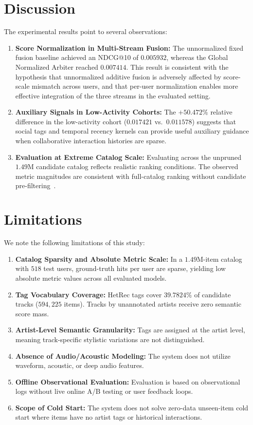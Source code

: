 \documentclass[conference]{IEEEtran}
\begin{document}
\section{Discussion}
The experimental results point to several observations:
\begin{enumerate}
    \item \textbf{Score Normalization in Multi-Stream Fusion:} The unnormalized fixed fusion baseline achieved an NDCG@10 of $0.005932$, whereas the Global Normalized Arbiter reached $0.007414$. This result is consistent with the hypothesis that unnormalized additive fusion is adversely affected by score-scale mismatch across users, and that per-user normalization enables more effective integration of the three streams in the evaluated setting.
    \item \textbf{Auxiliary Signals in Low-Activity Cohorts:} The $+50.472\%$ relative difference in the low-activity cohort ($0.017421$ vs.\ $0.011578$) suggests that social tags and temporal recency kernels can provide useful auxiliary guidance when collaborative interaction histories are sparse.
    \item \textbf{Evaluation at Extreme Catalog Scale:} Evaluating across the unpruned $1.49\text{M}$ candidate catalog reflects realistic ranking conditions. The observed metric magnitudes are consistent with full-catalog ranking without candidate pre-filtering~\cite{cremonesi2010performance}.
\end{enumerate}

\section{Limitations}
We note the following limitations of this study:
\begin{enumerate}
    \item \textbf{Catalog Sparsity and Absolute Metric Scale:} In a $1.49\text{M}$-item catalog with $518$ test users, ground-truth hits per user are sparse, yielding low absolute metric values across all evaluated models.
    \item \textbf{Tag Vocabulary Coverage:} HetRec tags cover $39.7824\%$ of candidate tracks ($594,225$ items). Tracks by unannotated artists receive zero semantic score mass.
    \item \textbf{Artist-Level Semantic Granularity:} Tags are assigned at the artist level, meaning track-specific stylistic variations are not distinguished.
    \item \textbf{Absence of Audio/Acoustic Modeling:} The system does not utilize waveform, acoustic, or deep audio features.
    \item \textbf{Offline Observational Evaluation:} Evaluation is based on observational logs without live online A/B testing or user feedback loops.
    \item \textbf{Scope of Cold Start:} The system does not solve zero-data unseen-item cold start where items have no artist tags or historical interactions.
\end{enumerate}
\end{document}
